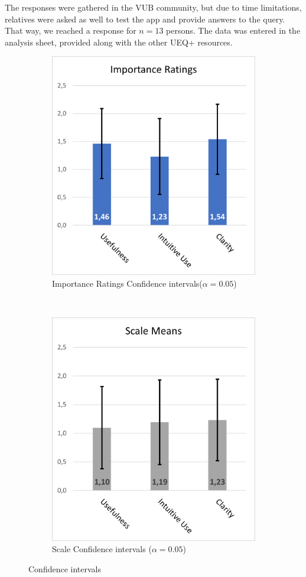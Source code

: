 \documentclass[a4paper, 11pt]{article}
\begin{document}
The responses were gathered in the VUB community, but due to time limitations, relatives were asked as well to test the app and provide answers to the query. That way, we reached a response for $n = 13$ persons. The data was entered in the analysis sheet, provided along with the other UEQ+ resources.\\

\begin{figure}[h]
	\centering
	\begin{subfigure}[t]{0.5\textwidth}
		\centering
		\includegraphics[width=0.7\linewidth]{figures/ImportanceRatings}
		\caption{Importance Ratings Confidence intervals($\alpha = 0.05$)}
		\label{fig:ImportanceRatings}
	\end{subfigure}%
	~ 
	\begin{subfigure}[t]{0.5\textwidth}
		\centering
		\includegraphics[width=0.7\linewidth]{figures/ScaleMeans}
		\caption{Scale Confidence intervals ($\alpha = 0.05$)}
		\label{fig:ScaleMeans}
	\end{subfigure}
	\caption{Confidence intervals}
	\label{fig:confInt}
\end{figure}
\end{document}
